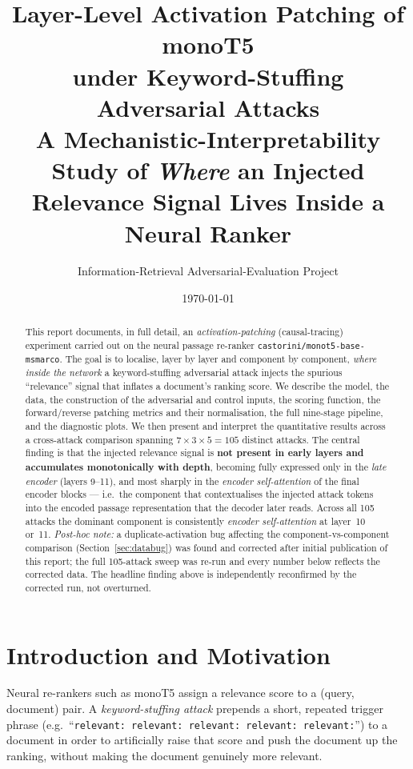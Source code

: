 \documentclass[11pt]{article}
\title{\textbf{Layer-Level Activation Patching of monoT5 \\[2pt]
under Keyword-Stuffing Adversarial Attacks} \\[6pt]
\large A Mechanistic-Interpretability Study of \emph{Where} an Injected
Relevance Signal Lives Inside a Neural Ranker}
\author{Information-Retrieval Adversarial-Evaluation Project}
\date{\today}
\begin{document}
\maketitle

\begin{abstract}
This report documents, in full detail, an \emph{activation-patching}
(causal-tracing) experiment carried out on the neural passage re-ranker
\texttt{castorini/monot5-base-msmarco}. The goal is to localise, layer by layer
and component by component, \emph{where inside the network} a keyword-stuffing
adversarial attack injects the spurious ``relevance'' signal that inflates a
document's ranking score. We describe the model, the data, the construction of
the adversarial and control inputs, the scoring function, the forward/reverse
patching metrics and their normalisation, the full nine-stage pipeline, and the
diagnostic plots. We then present and interpret the quantitative results across
a cross-attack comparison spanning $7\times3\times5 = 105$ distinct attacks.
The central finding
is that the injected relevance signal is \textbf{not present in early layers and
accumulates monotonically with depth}, becoming fully expressed only in the
\emph{late encoder} (layers 9--11), and most sharply in the
\emph{encoder self-attention} of the final encoder blocks — i.e.\ the component
that contextualises the injected attack tokens into the encoded passage
representation that the decoder later reads. Across all 105 attacks the dominant
component is consistently \emph{encoder self-attention} at layer~10 or~11.
\emph{Post-hoc note:} a duplicate-activation bug affecting the
component-vs-component comparison (Section~\ref{sec:databug}) was found and
corrected after initial publication of this report; the full 105-attack
sweep was re-run and every number below reflects the corrected data. The
headline finding above is independently reconfirmed by the corrected run,
not overturned.
\end{abstract}

\tableofcontents
\newpage

\section{Introduction and Motivation}

Neural re-rankers such as monoT5 assign a relevance score to a
(query, document) pair. A \emph{keyword-stuffing attack} prepends a short,
repeated trigger phrase (e.g.\ ``\texttt{relevant: relevant: relevant: relevant:
relevant:}'') to a document in order to artificially raise that score and push
the document up the ranking, without making the document genuinely more relevant.
\end{document}
